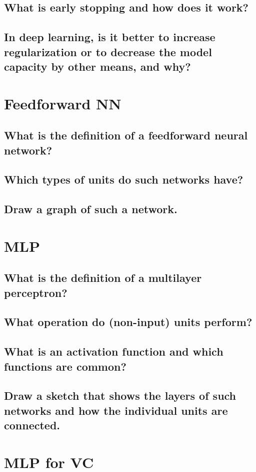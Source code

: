 \subsection{What is early stopping and how does it work?}
\subsection{In deep learning, is it better to increase regularization or to decrease the model capacity by other means, and why?}

\section{Feedforward NN}
\subsection{What is the definition of a feedforward neural network?}
\subsection{Which types of units do such networks have?}
\subsection{Draw a graph of such a network.}

\section{MLP}
\subsection{What is the definition of a multilayer perceptron?}
\subsection{What operation do (non-input) units perform?}
\subsection{What is an activation function and which functions are common?}
\subsection{Draw a sketch that shows the layers of such networks and how the individual units are connected.}

\section{MLP for VC}
